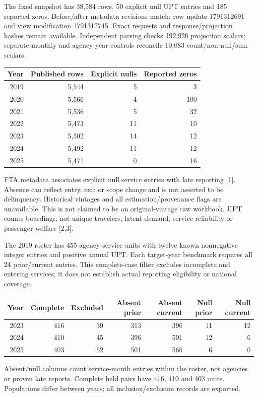 \documentclass[11pt]{article}
\begin{document}
The fixed snapshot has 38,584 rows, 50 explicit null UPT entries and 185 reported zeros. Before/after metadata revisions match: row update 1791312691 and view modification 1791312745. Exact requests and response/projection hashes remain available. Independent parsing checks 192,920 projection scalars; separate monthly and agency-year controls reconcile 10,083 count/non-null/sum scalars.

\begin{center}\small\setlength{\tabcolsep}{4pt}
\begin{tabular}{rrrr}\toprule
Year & Published rows & Explicit nulls & Reported zeros \\
\midrule
2019 & 5,544 & 5 & 3 \\
2020 & 5,566 & 4 & 100 \\
2021 & 5,536 & 5 & 32 \\
2022 & 5,473 & 11 & 10 \\
2023 & 5,502 & 14 & 12 \\
2024 & 5,492 & 11 & 12 \\
2025 & 5,471 & 0 & 16 \\
\bottomrule\end{tabular}\end{center}
FTA metadata associates explicit null service entries with late reporting [1]. Absence can reflect entry, exit or scope change and is not asserted to be delinquency. Historical vintages and all estimation/provenance flags are unavailable. This is not claimed to be an original-vintage raw workbook. UPT counts boardings, not unique travelers, latent demand, service reliability or passenger welfare [2,3].

The 2019 roster has 455 agency-service units with twelve known nonnegative integer entries and positive annual UPT. Each target-year benchmark requires all 24 prior/current entries. This complete-case filter excludes incomplete and entering services; it does not establish actual reporting eligibility or national coverage.

\begin{center}\small\setlength{\tabcolsep}{4pt}
\begin{tabular}{rrrrrrr}\toprule
Year & Complete & Excluded & Absent prior & Absent current & Null prior & Null current \\
\midrule
2023 & 416 & 39 & 313 & 396 & 11 & 12 \\
2024 & 410 & 45 & 396 & 501 & 12 & 6 \\
2025 & 403 & 52 & 501 & 566 & 6 & 0 \\
\bottomrule\end{tabular}\end{center}
Absent/null columns count service-month entries within the roster, not agencies or proven late reports. Complete held pairs have 416, 410 and 403 units. Populations differ between years; all inclusion/exclusion records are exported.
\end{document}
